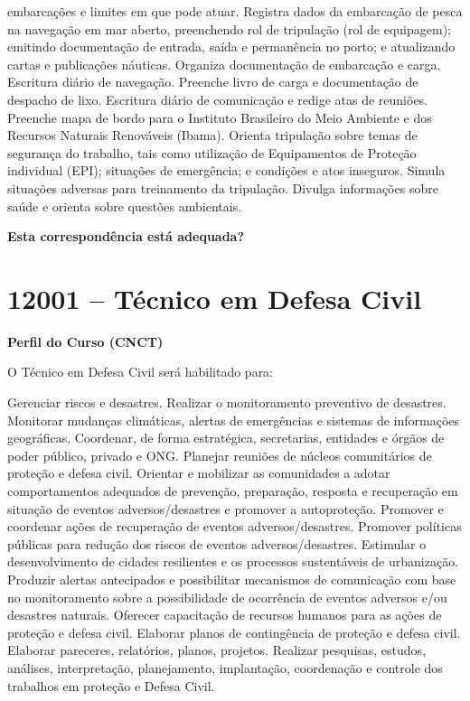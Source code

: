 \documentclass[
]{article}
\begin{document}
embarcações e limites em que pode atuar. Registra dados da embarcação de
pesca na navegação em mar aberto, preenchendo rol de tripulação (rol de
equipagem); emitindo documentação de entrada, saída e permanência no
porto; e atualizando cartas e publicações náuticas. Organiza
documentação de embarcação e carga. Escritura diário de navegação.
Preenche livro de carga e documentação de despacho de lixo. Escritura
diário de comunicação e redige atas de reuniões. Preenche mapa de bordo
para o Instituto Brasileiro do Meio Ambiente e dos Recursos Naturais
Renováveis (Ibama). Orienta tripulação sobre temas de segurança do
trabalho, tais como utilização de Equipamentos de Proteção individual
(EPI); situações de emergência; e condições e atos inseguros. Simula
situações adversas para treinamento da tripulação. Divulga informações
sobre saúde e orienta sobre questões ambientais.

\begin{Form}
\textbf{Esta correspondência está adequada?} \\ 
\end{Form}

\newpage
\section{ 12001 -- Técnico em Defesa Civil }

\textbf{Perfil do Curso (CNCT)}

O Técnico em Defesa Civil será habilitado para:

Gerenciar riscos e desastres. Realizar o monitoramento preventivo de
desastres. Monitorar mudanças climáticas, alertas de emergências e
sistemas de informações geográficas. Coordenar, de forma estratégica,
secretarias, entidades e órgãos de poder público, privado e ONG.
Planejar reuniões de núcleos comunitários de proteção e defesa civil.
Orientar e mobilizar as comunidades a adotar comportamentos adequados de
prevenção, preparação, resposta e recuperação em situação de eventos
adversos/desastres e promover a autoproteção. Promover e coordenar ações
de recuperação de eventos adversos/desastres. Promover políticas
públicas para redução dos riscos de eventos adversos/desastres.
Estimular o desenvolvimento de cidades resilientes e os processos
sustentáveis de urbanização. Produzir alertas antecipados e possibilitar
mecanismos de comunicação com base no monitoramento sobre a
possibilidade de ocorrência de eventos adversos e/ou desastres naturais.
Oferecer capacitação de recursos humanos para as ações de proteção e
defesa civil. Elaborar planos de contingência de proteção e defesa
civil. Elaborar pareceres, relatórios, planos, projetos. Realizar
pesquisas, estudos, análises, interpretação, planejamento, implantação,
coordenação e controle dos trabalhos em proteção e Defesa Civil.
\end{document}
